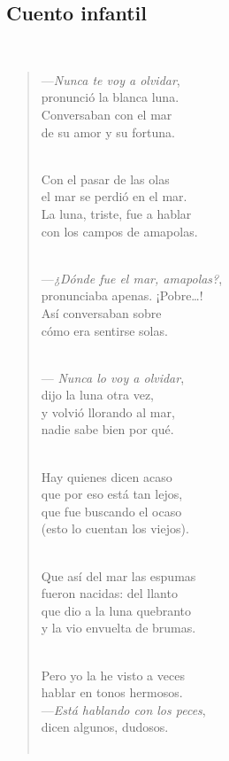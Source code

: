 \documentclass[a4paper, 12pt]{article}
\begin{document}
\pagebreak 

\subsection{Cuento infantil}
~ 
\begin{verse}
    
—\textit{Nunca te voy a olvidar},\\
pronunció la blanca luna.\\
Conversaban con el mar\\
de su amor y su fortuna.\\
~ 

Con el pasar de las olas\\
el mar se perdió en el mar.\\
La luna, triste, fue a hablar\\
con los campos de amapolas.\\
~ 

—\textit{¿Dónde fue el mar, amapolas?},\\
pronunciaba apenas. ¡Pobre…!\\
Así conversaban sobre\\
cómo era sentirse solas.\\
~ 

— \textit{Nunca lo voy a olvidar},\\
dijo la luna otra vez,\\
y volvió llorando al mar,\\
nadie sabe bien por qué.\\
~ 

Hay quienes dicen acaso\\
que por eso está tan lejos,\\
que fue buscando el ocaso\\
(esto lo cuentan los viejos).\\
~ 

Que así del mar las espumas\\
fueron nacidas: del llanto\\
que dio a la luna quebranto\\
y la vio envuelta de brumas.\\
~ 

Pero yo la he visto a veces\\
hablar en tonos hermosos.\\
—\textit{Está hablando con los peces},\\
 dicen algunos, dudosos.\\
 ~ 


\end{verse}
\end{document}

